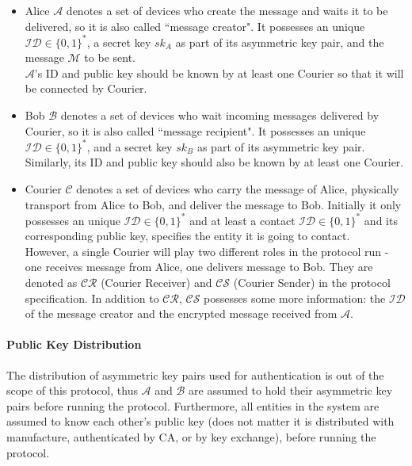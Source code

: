 \begin{itemize}
\item Alice $\mathcal{A}$ denotes a set of devices who create the message and waits it to be delivered, so it is also called ``message creator". It possesses an unique $\mathcal{ID} \in \{0, 1\}^*$, a secret key $sk_A$ as part of its asymmetric key pair, and the message $\mathcal{M}$ to be sent. \\
$\mathcal{A}$'s ID and public key should be known by at least one Courier so that it will be connected by Courier.

\item Bob $\mathcal{B}$ denotes a set of devices who wait incoming messages delivered by Courier, so it is also called ``message recipient". It possesses an unique $\mathcal{ID} \in \{0, 1\}^*$, and a secret key $sk_B$ as part of its asymmetric key pair.\\
Similarly, its ID and public key should also be known by at least one Courier.

\item Courier $\mathcal{C}$ denotes a set of devices who carry the message of Alice, physically transport from Alice to Bob, and deliver the message to Bob. Initially it only possesses an unique $\mathcal{ID} \in \{0, 1\}^*$ and at least a contact $\mathcal{ID} \in \{0, 1\}^*$ and its corresponding public key, specifies the entity it is going to contact.\\
However, a single Courier will play two different roles in the protocol run - one receives message from Alice, one delivers message to Bob. They are denoted as $\mathcal{CR}$ (Courier Receiver) and $\mathcal{CS}$ (Courier Sender) in the protocol specification. In addition to $\mathcal{CR}$, $\mathcal{CS}$ possesses some more information: the $\mathcal{ID}$ of the message creator and the encrypted message received from $\mathcal{A}$.
\end{itemize}

\paragraph{Public Key Distribution}
The distribution of asymmetric key pairs used for authentication is out of the scope of this protocol, thus $\mathcal{A}$ and $\mathcal{B}$ are assumed to hold their asymmetric key pairs before running the protocol. Furthermore, all entities in the system are assumed to know each other's public key (does not matter it is distributed with manufacture, authenticated by CA, or by key exchange), before running the protocol.

